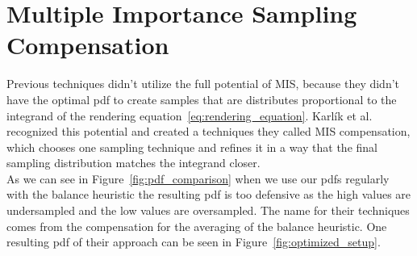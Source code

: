 \chapter{Multiple Importance Sampling Compensation}
\label{ch:mis_compensation}
Previous techniques didn't utilize the full potential of MIS,
because they didn't have the optimal pdf to create samples that are distributes proportional
to the integrand of the rendering equation~\ref{eq:rendering_equation}.
Karl\'ik et al.~\cite{Karlik2019} recognized this potential and created a techniques they called MIS compensation,
which chooses one sampling technique and refines it in a way that the final sampling distribution matches the integrand closer.\\
As we can see in Figure~\ref{fig:pdf_comparison} when we use our pdfs regularly with the balance heuristic
the resulting pdf is too defensive as the high values are undersampled and the low values are oversampled.
The name for their techniques comes from the compensation for the averaging of the balance heuristic.
One resulting pdf of their approach can be seen in Figure~\ref{fig:optimized_setup}.

